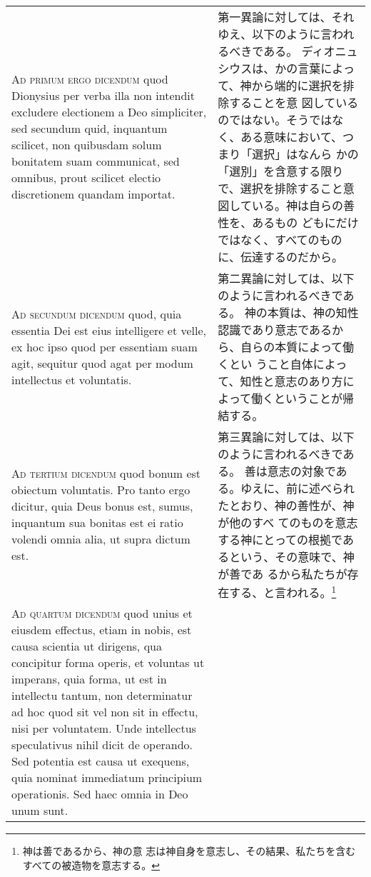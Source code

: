 \documentclass[10pt]{jsarticle} %
\begin{document}
\begin{longtable}{p{21em}p{21em}}
\\



{\scshape Ad primum ergo dicendum} quod Dionysius per
 verba illa non intendit excludere electionem a Deo simpliciter, sed
 secundum quid, inquantum scilicet, non quibusdam solum bonitatem suam
 communicat, sed omnibus, prout scilicet electio discretionem quandam
 importat.

 
&

第一異論に対しては、それゆえ、以下のように言われるべきである。
ディオニュシウスは、かの言葉によって、神から端的に選択を排除することを意
 図しているのではない。そうではなく、ある意味において、つまり「選択」はなんら
 かの「選別」を含意する限りで、選択を排除すること意図している。神は自らの善性を、あるもの
 どもにだけではなく、すべてのものに、伝達するのだから。


\\



{\scshape Ad secundum dicendum} quod, quia essentia Dei
 est eius intelligere et velle, ex hoc ipso quod per essentiam suam
 agit, sequitur quod agat per modum intellectus et voluntatis.

 
&

第二異論に対しては、以下のように言われるべきである。
神の本質は、神の知性認識であり意志であるから、自らの本質によって働くとい
 うこと自体によって、知性と意志のあり方によって働くということが帰結する。


\\



{\scshape Ad tertium dicendum} quod bonum est obiectum
 voluntatis. Pro tanto ergo dicitur, quia Deus bonus est, sumus,
 inquantum sua bonitas est ei ratio volendi omnia alia, ut supra dictum
 est.

 
&

第三異論に対しては、以下のように言われるべきである。
善は意志の対象である。ゆえに、前に述べられたとおり、神の善性が、神が他のすべ
 てのものを意志する神にとっての根拠であるという、その意味で、神が善であ
 るから私たちが存在する、と言われる。\footnote{神は善であるから、神の意
 志は神自身を意志し、その結果、私たちを含むすべての被造物を意志する。}


\\



{\scshape Ad quartum dicendum} quod unius et eiusdem
 effectus, etiam in nobis, est causa scientia ut dirigens, qua
 concipitur forma operis, et voluntas ut imperans, quia forma, ut est in
 intellectu tantum, non determinatur ad hoc quod sit vel non sit in
 effectu, nisi per voluntatem. Unde intellectus speculativus nihil dicit
 de operando. Sed potentia est causa ut exequens, quia nominat
 immediatum principium operationis. Sed haec omnia in Deo unum sunt.
 

\end{longtable}
\end{document}
